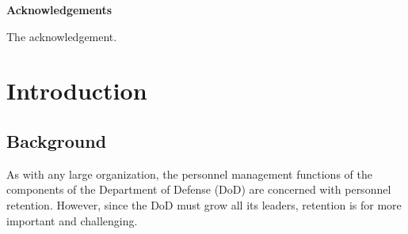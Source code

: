 \documentclass[12pt,letterpaper,toc=flat,oneside]{report}
\theoremstyle{definition}
\theoremstyle{definition}
\theoremstyle{definition}
\theoremstyle{remark}
\begin{document}
\thispagestyle{plain}
    \begin{center}
	\Large\bfseries Acknowledgements
    \end{center}
    \vspace{3em}
    The acknowledgement.
 \newpage
\renewcommand\contentsname{\centering \Large Table of Contents}
\singlespace
\tableofcontents
\newpage
\renewcommand\listtablename{\centering \Large List of Tables}
\listoftables
\newpage
\renewcommand\listfigurename{\centering \Large List of Figures}
\listoffigures
\newpage
\setcounter{chapter}{0}
\doublespacing
\setcounter{page}{1}
	\renewcommand{\thepage}{\arabic{page}}
\hypertarget{introduction}{%
\chapter{Introduction}\label{introduction}}

\hypertarget{background}{%
\section{Background}\label{background}}

As with any large organization, the personnel management functions of
the components of the Department of Defense (DoD) are concerned with
personnel retention. However, since the DoD must grow all its leaders,
retention is for more important and challenging.
\end{document}

